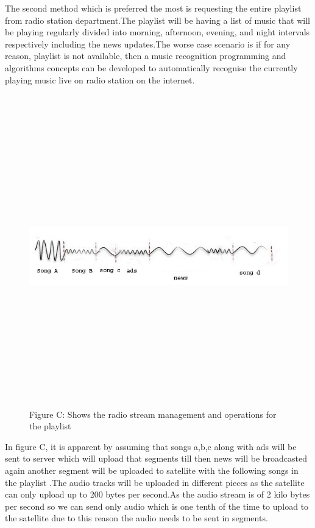 The second method which is preferred the most is requesting the entire playlist from radio station department.The playlist will be having a list of music that will be playing regularly divided into morning, afternoon, evening, and night intervals respectively including the news updates.The worse case scenario is if for any reason, playlist is not available, then a music recognition programming and algorithms concepts can be developed to automatically recognise the currently playing music live on radio station on the internet.\\
\\

\begin{figure}
\begin{centering}
\includegraphics[width=13cm,height=13cm,keepaspectratio]{Figures/3.jpg}
\caption{Figure C: Shows the radio stream management and operations for the playlist}
\label{radio-transmitter-injection-portal}
\end{centering}
\end{figure} 


In figure C, it is apparent  by assuming that songs a,b,c along with ads will be sent to server  which will upload that segments till then news will be broadcasted  again another segment will be uploaded to satellite with the following songs in the playlist .The audio tracks will be uploaded in different pieces as the satellite can only upload up to 200 bytes per second.As the audio stream is of 2 kilo bytes per second  so we can send only audio which is one tenth of the time  to upload to the satellite due to this reason the audio needs to be sent in segments.\\

